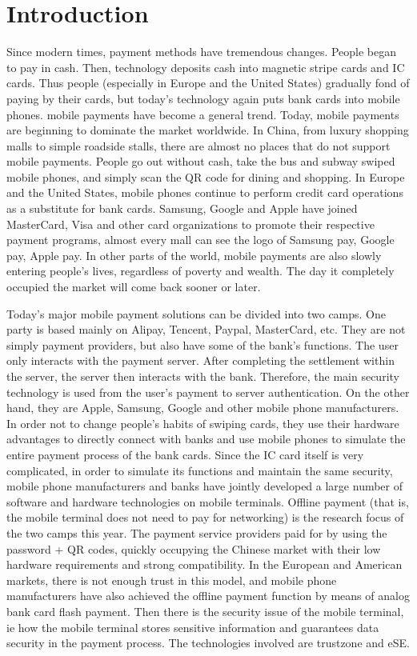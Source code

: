 \documentclass[journal]{IEEEtran}
\begin{document}
\section{Introduction}
\IEEEPARstart
Since modern times, payment methods have tremendous changes. People began to pay in cash. Then, technology deposits cash into magnetic stripe cards and IC cards. Thus people (especially in Europe and the United States) gradually fond of paying by their cards, but today's technology again puts bank cards into mobile phones. mobile payments have become a general trend. Today, mobile payments are beginning to dominate the market worldwide. In China, from luxury shopping malls to simple roadside stalls, there are almost no places that do not support mobile payments. People go out without cash, take the bus and subway swiped mobile phones, and simply scan the QR code for dining and shopping. In Europe and the United States, mobile phones continue to perform credit card operations as a substitute for bank cards. Samsung, Google and Apple have joined MasterCard, Visa and other card organizations to promote their respective payment programs, almost every mall can see the logo of Samsung pay, Google pay, Apple pay. In other parts of the world, mobile payments are also slowly entering people’s lives, regardless of poverty and wealth. The day it completely occupied the market will come back sooner or later.

Today's major mobile payment solutions can be divided into two camps. One party is based mainly on Alipay, Tencent, Paypal, MasterCard, etc. They are not simply payment providers, but also have some of the bank's functions. The user only interacts with the payment server. After completing the settlement within the server, the server then interacts with the bank. Therefore, the main security technology is used from the user's payment to server authentication. On the other hand, they are Apple, Samsung, Google and other mobile phone manufacturers. In order not to change people's habits of swiping cards, they use their hardware advantages to directly connect with banks and use mobile phones to simulate the entire payment process of the bank cards. Since the IC card itself is very complicated, in order to simulate its functions and maintain the same security, mobile phone manufacturers and banks have jointly developed a large number of software and hardware technologies on mobile terminals. Offline payment (that is, the mobile terminal does not need to pay for networking) is the research focus of the two camps this year. The payment service providers paid for by using the password + QR codes, quickly occupying the Chinese market with their low hardware requirements and strong compatibility. In the European and American markets, there is not enough trust in this model, and mobile phone manufacturers have also achieved the offline payment function by means of analog bank card flash payment. Then there is the security issue of the mobile terminal, ie how the mobile terminal stores sensitive information and guarantees data security in the payment process. The technologies involved are trustzone and eSE.
\end{document}
